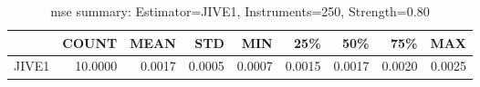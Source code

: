\begin{table}[ht]
\centering
\caption{mse summary: Estimator=JIVE1, Instruments=250, Strength=0.80}
\begin{tabular}{lrrrrrrrr}
\toprule
 & COUNT & MEAN & STD & MIN & 25\% & 50\% & 75\% & MAX \\
\midrule
JIVE1 & 10.0000 & 0.0017 & 0.0005 & 0.0007 & 0.0015 & 0.0017 & 0.0020 & 0.0025 \\
\bottomrule
\end{tabular}
\end{table}
